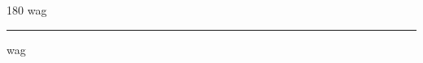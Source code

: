 
\begin{frame}
\begin{center}
\begin{turn}{180}
{\fontsize{2.5cm}{1em}\selectfont wag}
\end{turn}
\vspace{1em}\par  
\hrule
\vspace{1em}\par  
{\fontsize{2.5cm}{1em}\selectfont wag}
\end{center}
\end{frame}
